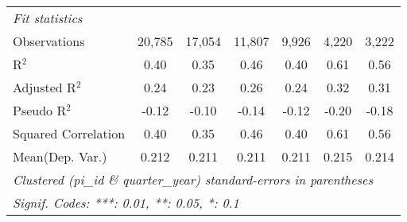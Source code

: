 \begin{tabular}{lcccccc}
   \midrule
   \emph{Fit statistics}\\
   Observations                                               & 20,785          & 17,054    & 11,807    & 9,926     & 4,220          & 3,222\\  
   R$^2$                                                      & 0.40            & 0.35      & 0.46      & 0.40      & 0.61           & 0.56\\  
   Adjusted R$^2$                                             & 0.24            & 0.23      & 0.26      & 0.24      & 0.32           & 0.31\\  
   Pseudo R$^2$                                               & -0.12           & -0.10     & -0.14     & -0.12     & -0.20          & -0.18\\  
   Squared Correlation                                        & 0.40            & 0.35      & 0.46      & 0.40      & 0.61           & 0.56\\  
Mean(Dep. Var.) & 0.212 & 0.211 & 0.211 & 0.211 & 0.215 & 0.214 \\
   \midrule \midrule
   \multicolumn{7}{l}{\emph{Clustered (pi\_id \& quarter\_year) standard-errors in parentheses}}\\
   \multicolumn{7}{l}{\emph{Signif. Codes: ***: 0.01, **: 0.05, *: 0.1}}\\
\end{tabular}
\par\endgroup

